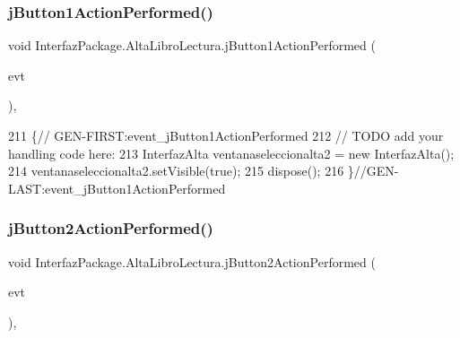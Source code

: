 \subsubsection{\texorpdfstring{j\+Button1\+Action\+Performed()}{jButton1ActionPerformed()}}
{\footnotesize\ttfamily void Interfaz\+Package.\+Alta\+Libro\+Lectura.\+j\+Button1\+Action\+Performed (\begin{DoxyParamCaption}\item[{java.\+awt.\+event.\+Action\+Event}]{evt }\end{DoxyParamCaption})\hspace{0.3cm}{\ttfamily [inline]}, {\ttfamily [private]}}


\begin{DoxyCode}
211                                                                          \{\textcolor{comment}{//
      GEN-FIRST:event\_jButton1ActionPerformed}
212         \textcolor{comment}{// TODO add your handling code here:}
213         InterfazAlta ventanaseleccionalta2 = \textcolor{keyword}{new} InterfazAlta();
214         ventanaseleccionalta2.setVisible(\textcolor{keyword}{true});
215         dispose();
216     \}\textcolor{comment}{//GEN-LAST:event\_jButton1ActionPerformed}
\end{DoxyCode}
\mbox{\label{class_interfaz_package_1_1_alta_libro_lectura_a2e75097b1dde02511d6f9209ee624e73}} 
\subsubsection{\texorpdfstring{j\+Button2\+Action\+Performed()}{jButton2ActionPerformed()}}
{\footnotesize\ttfamily void Interfaz\+Package.\+Alta\+Libro\+Lectura.\+j\+Button2\+Action\+Performed (\begin{DoxyParamCaption}\item[{java.\+awt.\+event.\+Action\+Event}]{evt }\end{DoxyParamCaption})\hspace{0.3cm}{\ttfamily [inline]}, {\ttfamily [private]}}


